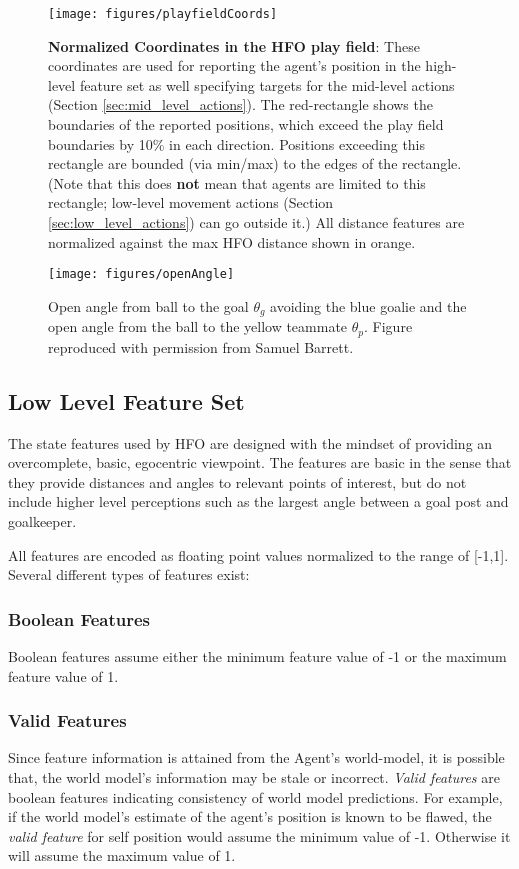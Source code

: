 \documentclass[12pt]{article}
\begin{document}
\begin{figure}[htp]
  \centering
  \texttt{[image: figures/playfieldCoords]}
  \caption{\textbf{Normalized Coordinates in the HFO play field}:
    These coordinates are used for reporting the agent's position in
    the high-level feature set as well specifying targets for the
    mid-level actions (Section \ref{sec:mid_level_actions}). The
    red-rectangle shows the boundaries of the reported positions,
    which exceed the play field boundaries by 10\% in each
    direction. Positions exceeding this rectangle are bounded (via
    min/max) to the edges of the rectangle. (Note that this does
    \textbf{not} mean that agents are limited to this rectangle;
    low-level movement actions (Section \ref{sec:low_level_actions})
    can go outside it.) All distance features are normalized against
    the max HFO distance shown in orange.}
  \label{fig:playfieldCoords}
\end{figure}

\begin{figure}[htp]
  \centering
  \texttt{[image: figures/openAngle]}
  \caption{Open angle from ball to the goal $\theta_g$ avoiding the
    blue goalie and the open angle from the ball to the yellow
    teammate $\theta_p$. Figure reproduced with permission from Samuel
    Barrett.}
  \label{fig:openAngle}
\end{figure}

\subsection {Low Level Feature Set}
The state features used by HFO are designed with the mindset of
providing an overcomplete, basic, egocentric viewpoint. The features
are basic in the sense that they provide distances and angles to
relevant points of interest, but do not include higher level
perceptions such as the largest angle between a goal post and
goalkeeper.

All features are encoded as floating point values normalized to the
range of [-1,1]. Several different types of features exist:

\subsubsection{Boolean Features}
Boolean features assume either the minimum feature value of -1 or the
maximum feature value of 1.

\subsubsection{Valid Features}
Since feature information is attained from the Agent's world-model, it
is possible that, the world model's information may be stale or
incorrect. \textit{Valid features} are boolean features indicating
consistency of world model predictions. For example, if the world
model's estimate of the agent's position is known to be flawed, the
\textit{valid feature} for self position would assume the minimum
value of -1. Otherwise it will assume the maximum value of 1.
\end{document}
